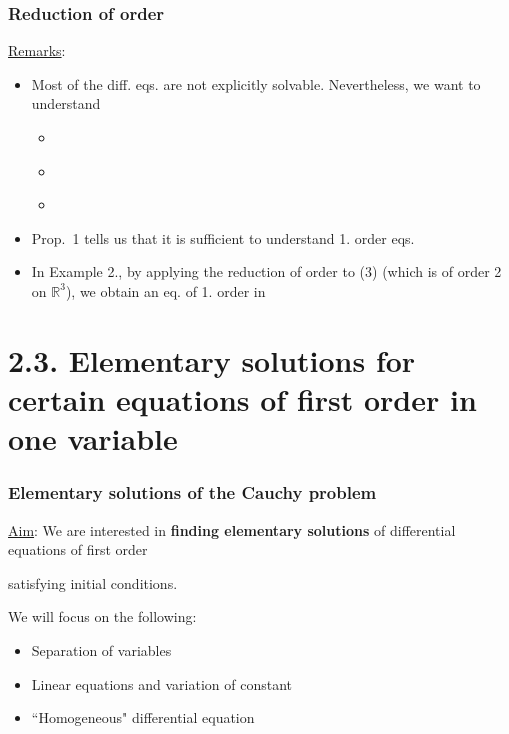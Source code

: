 \documentclass[10pt]{beamer}
\newcommand{\R}{\mathbb{R}}
\begin{document}
{\begin{frame} \frametitle{Reduction of order}
\underline{Remarks}:
\begin{itemize}
\item Most of the diff. eqs. are not explicitly solvable. Nevertheless, we want to understand
\begin{itemize}
\item \;\\
\vspace{0.2cm}
\item\;\\
\vspace{0.2cm}
\item\;\\
\vspace{0.2cm}
\end{itemize}
\item Prop.~1 tells us that it is sufficient to understand 1. order eqs.
\item In Example 2.,  by applying the reduction  of order to (3) (which is of order 2 on $\R^3$), we obtain an eq. of 1. order in
$$\;$$
\end{itemize}
\end{frame}



\section{2.3. Elementary solutions for certain equations of first order in one variable}

\begin{frame}\frametitle{Elementary solutions of the Cauchy problem}
\underline{Aim}: We are interested in \textbf{finding elementary solutions} of differential equations of first order
\begin{block}{}
\vspace{0.5cm}
\end{block}
satisfying initial conditions.
\vspace{0.4cm}

We will focus on the following:
\vspace{0.2cm}
\begin{itemize}
\item[\ding{228}] Separation of variables
\item[\ding{228}] Linear equations and variation of constant
\item[\ding{228}] ``Homogeneous" differential equation
\end{itemize}
\end{frame}

}
\end{document}

